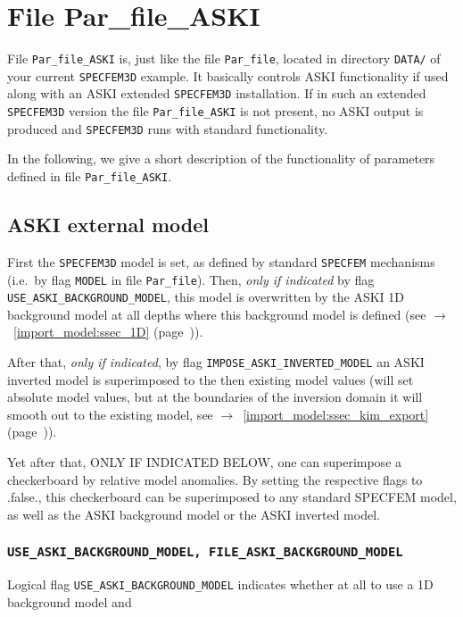 \documentclass[12pt,a4paper]{article}
\newcommand{\lcode}[1]{\nolinkurl{#1}}
\newcommand{\lcodetitle}[1]{ {\ttfamily #1} }
\newcommand{\ASKI}{ {\ttfamily ASKI} }
\newcommand{\myaref}[1]{$\rightarrow$~\ref{#1} (page~\pageref{#1})}
\begin{document}
\section{File \lcodetitle{Par\_file\_ASKI}} \label{file_Par_file_ASKI}
%
File \lcode{Par_file_ASKI} is, just like the file \lcode{Par_file}, located in directory 
\lcode{DATA/} of your current \lcode{SPECFEM3D} example. It basically controls \ASKI functionality 
if used along with an \ASKI extended \lcode{SPECFEM3D} installation. If in such an 
extended \lcode{SPECFEM3D} version the file \lcode{Par_file_ASKI} is not present, no \ASKI output 
is produced and \lcode{SPECFEM3D} runs with standard functionality. 

In the following, we give a short description of the functionality of parameters defined
in file \lcode{Par_file_ASKI}.
\subsection{\lcodetitle{ASKI} external model} \label{Par_file_ASKI,sub:ext_model}
First the \lcode{SPECFEM3D} model is set, as defined by standard \lcode{SPECFEM} mechanisms (i.e.\ by
flag \lcode{MODEL} in file \lcode{Par_file}). 
Then, \emph{only if indicated} by flag \lcode{USE_ASKI_BACKGROUND_MODEL}, this model is overwritten 
by the \ASKI 1D background model at all depths where this background model is defined (see
\myaref{import_model:ssec_1D}).

After that, \emph{only if indicated}, by flag \lcode{IMPOSE_ASKI_INVERTED_MODEL} an \ASKI inverted 
model is superimposed to the then existing model values (will set absolute model values, 
but at the boundaries of the inversion domain it will smooth out to the existing model, see
\myaref{import_model:ssec_kim_export}).

Yet after that, ONLY IF INDICATED BELOW, one can superimpose a checkerboard by relative model anomalies. By setting 
the respective flags to .false., this checkerboard can be superimposed to any standard SPECFEM model, as well as the ASKI background model
or the ASKI inverted model. 

\subsubsection*{\lcode{USE_ASKI_BACKGROUND_MODEL, FILE_ASKI_BACKGROUND_MODEL}}
Logical flag \lcode{USE_ASKI_BACKGROUND_MODEL} indicates whether at all to use a 1D background model and
\end{document}
